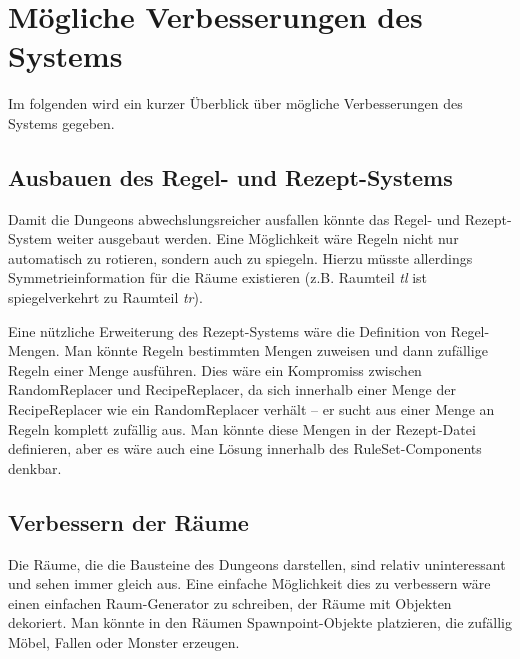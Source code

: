


\section{Mögliche Verbesserungen des Systems}\label{s.verbesserungen}

Im folgenden wird ein kurzer Überblick über mögliche Verbesserungen des Systems gegeben.

\subsection{Ausbauen des Regel- und Rezept-Systems}

Damit die Dungeons abwechslungsreicher ausfallen könnte das Regel- und Rezept-System weiter ausgebaut werden. Eine Möglichkeit wäre Regeln nicht nur automatisch zu rotieren, sondern auch zu spiegeln. Hierzu müsste allerdings Symmetrieinformation für die Räume existieren (z.B. Raumteil \textit{tl} ist spiegelverkehrt zu Raumteil \textit{tr}).

Eine nützliche Erweiterung des Rezept-Systems wäre die Definition von Regel-Mengen. Man könnte Regeln bestimmten Mengen zuweisen und dann zufällige Regeln einer Menge ausführen. Dies wäre ein Kompromiss zwischen RandomReplacer und RecipeReplacer, da sich innerhalb einer Menge der RecipeReplacer wie ein RandomReplacer verhält -- er sucht aus einer Menge an Regeln komplett zufällig aus. Man könnte diese Mengen in der Rezept-Datei definieren, aber es wäre auch eine Lösung innerhalb des RuleSet-Components denkbar.

\subsection{Verbessern der Räume}

Die Räume, die die Bausteine des Dungeons darstellen, sind relativ uninteressant und sehen immer gleich aus. Eine einfache Möglichkeit dies zu verbessern wäre einen einfachen Raum-Generator zu schreiben, der Räume mit Objekten dekoriert. Man könnte in den Räumen Spawnpoint-Objekte platzieren, die zufällig Möbel, Fallen oder Monster erzeugen.

